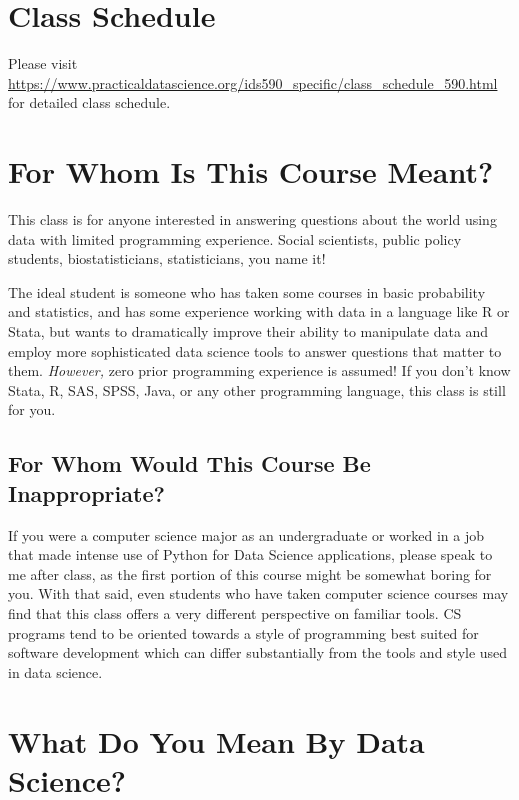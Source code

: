 \documentclass[12pt]{article}
\begin{document}
\section{Class Schedule}

Please visit \href{http://www.practicaldatascience.org/ids590_specific/class_schedule_590.html}{https://www.practicaldatascience.org/ids590\_specific/class\_schedule\_590.html} for detailed class schedule.

\section{For Whom Is This Course Meant?}

This class is for anyone interested in answering questions about the world using data with limited programming experience. Social scientists, public policy students, biostatisticians, statisticians, you name it!

The ideal student is someone who has taken some courses in basic probability and statistics, and has some experience working with data in a language like R or Stata, but wants to dramatically improve their ability to manipulate data and employ more sophisticated data science tools to answer questions that matter to them.  \emph{However,} zero prior programming experience is assumed!  If you don't know Stata, R, SAS, SPSS, Java, or any other programming language, this class is still for you.

\subsection{For Whom Would This Course Be Inappropriate?}

If you were a computer science major as an undergraduate or worked in a job that made intense use of Python for Data Science applications, please speak to me after class, as the first portion of this course might be somewhat boring for you. With that said, even students who have taken computer science courses may find that this class offers a very different perspective on familiar tools. CS programs tend to be oriented towards a style of programming best suited for software development which can differ substantially from the tools and style used in data science.

\section{What Do You Mean By Data Science?}
\end{document}

